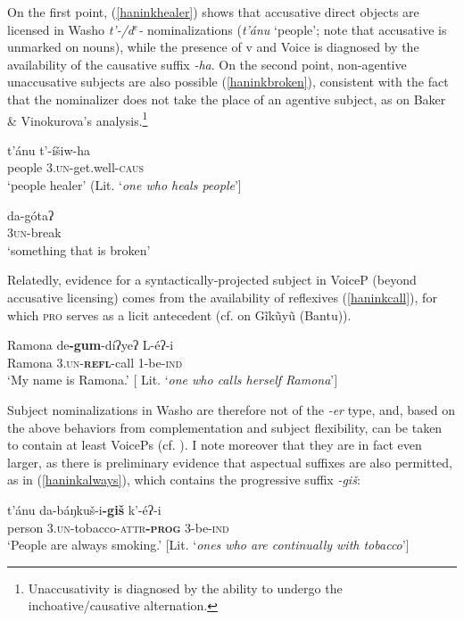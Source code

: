 \documentclass[output=paper]{langscibook}
\begin{document}
On the first point, (\ref{haninkhealer}) shows that accusative direct objects are licensed in Washo  {\itshape t'-/d$^e$-} nominalizations ({\itshape t'ánu} `people'; note that accusative is unmarked on nouns), while the presence of v and Voice is diagnosed by the availability of the causative suffix {\itshape -ha}. On the second point, non-agentive unaccusative subjects are also possible (\ref{haninkbroken}), consistent with the fact that the nominalizer does not take the place of an agentive subject, as on Baker \& Vinokurova's \citeyear{bakervinokurova2009} analysis.\footnote{Unaccusativity is diagnosed by the ability to undergo the inchoative/causative alternation.}


\ea \gll t'ánu t'-íšiw-ha\\
people 3.\textsc{un}-get.well-{\scshape caus}\\
\glt `people healer' (Lit. `{\itshape one who heals people}'] \label{haninkhealer}
\z

\ea \gll da-gótaʔ\\
\textsc{3{\scshape un}}-{break}\\
\glt `something that is broken' \label{haninkbroken}
\z 

\noindent Relatedly, evidence for a syntactically-projected subject in VoiceP (beyond accusative licensing) comes from the availability of reflexives (\ref{haninkcall}), for which {\scshape pro} serves as a licit antecedent (cf. \citealt{bakervinokurova2009} on Gĩkũyũ (Bantu)). 

\ea \gll Ramona de{\bfseries -gum}-díʔyeʔ L-éʔ-i\\
Ramona {\scshape 3.{\scshape un}}-\textbf{\textsc{refl}}-call 1-be-{\scshape ind}\\
\glt `My name is Ramona.' $[$ Lit. `{\itshape one who calls herself Ramona}'$]$ \label{haninkcall}
\z

Subject nominalizations in Washo are therefore not of the {\itshape -er} type, and, based on the above behaviors from complementation and subject flexibility, can be taken to contain at least VoicePs (cf.  \citealt{bochnaketal2011}). I note moreover that they are in fact even larger, as there is preliminary evidence that aspectual suffixes are also permitted, as in (\ref{haninkalways}), which contains the progressive suffix {\itshape -giš}:%

 \ea \gll t'ánu da-báŋkuš-i{\bf-giš} k'-é{ʔ}-i\\
person {\scshape 3.un}-tobacco-{\scshape attr}\textbf{\textsc{-prog}} 3-be-{\scshape ind}\\
\glt `People are always smoking.' $[$Lit. `{\itshape ones who are continually with tobacco}'$]$ \label{haninkalways}
\z
\end{document}
